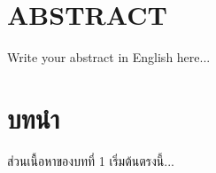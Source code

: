 \documentclass[12pt,a4paper]{report}
\begin{document}
\chapter*{ABSTRACT}
Write your abstract in English here...

\tableofcontents
\clearpage

\chapter{บทนำ}
ส่วนเนื้อหาของบทที่ 1 เริ่มต้นตรงนี้...
\end{document}
